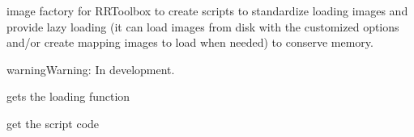 \documentclass[letterpaper,10pt,english]{sphinxmanual}
\begin{document}

\begin{fulllineitems}
\label{RRtoolbox.lib:RRtoolbox.lib.image.imFactory}
image factory for RRToolbox to create scripts to standardize loading images and
provide lazy loading (it can load images from disk with the customized options
and/or create mapping images to load when needed) to conserve memory.

\begin{notice}{warning}{Warning:}
In development.
\end{notice}

\begin{fulllineitems}
\label{RRtoolbox.lib:RRtoolbox.lib.image.imFactory.get_Func}
gets the loading function

\end{fulllineitems}


\begin{fulllineitems}
\label{RRtoolbox.lib:RRtoolbox.lib.image.imFactory.get_code}
get the script code

\end{fulllineitems}


\begin{fulllineitems}
\label{RRtoolbox.lib:RRtoolbox.lib.image.imFactory.get_convertionFunc}
\end{fulllineitems}


\begin{fulllineitems}
\label{RRtoolbox.lib:RRtoolbox.lib.image.imFactory.get_errorFunc}
\end{fulllineitems}


\begin{fulllineitems}
\label{RRtoolbox.lib:RRtoolbox.lib.image.imFactory.get_loadFunc}
\end{fulllineitems}


\end{fulllineitems}
\end{document}
